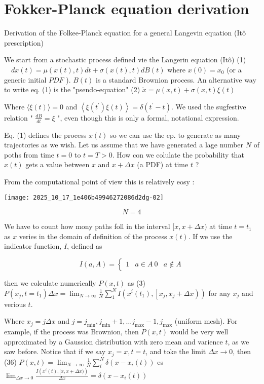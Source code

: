\section{Fokker-Planck equation derivation}
Derivation of the Folkee-Planck equation for a general Langevin equation (Itô prescription)

We start from a stochastic process defined vie the Langerin equation (Itô)
(1) $\quad d x(t)=\mu(x(t), t) d t+\sigma(x(t), t) d B(t)$
where $x(0)=x_{0}$ (or a generic initial $P D F$ ). $B(t)$ is a standard Brownion process.
An alternative way to write eq. (1) is the "psendo-equation"
(2) $\dot{x}=\mu(x, t)+\sigma(x, t) \xi(t)$

Where $\langle\xi(t)\rangle=0$ and $\left\langle\xi\left(t^{\prime}\right) \xi(t)\right\rangle=\delta\left(t^{\prime}-t\right)$. We used the sugfestive relation " $\frac{d B}{d t}=\xi$ ", even though this is only a formal, notational expression.

Eq. (1) defines the process $x(t)$ so we can use the ep. to generate as many trajectories as we wish. Let us assume that we have generated a lage number $N$ of poths from time $t=0$ to $t=T>0$. How con we colulate the probability that $x(t)$ gets a value between $x$ and $x+\Delta x$ (a PDF) at time $t$ ?

From the computational point of view this is relatively eosy :
\begin{center}
\texttt{[image: 2025\_10\_17\_1e406b49946272086d2dg-02]}
\end{center}

$$
N=4
$$

We have to count how mony paths foll in the interval $[x, x+\Delta x)$ at time $t=t_{1}$ as $x$ veries in the domain of definition of the process $x(t)$.
If we use the indicator function, $I$, defined as

$$ I(a, A)= \begin{cases}1 & a \in A \ 0 & a \notin A\end{cases} $$

then we colculate numerically $P(x, t)$ as
(3) $P\left(x_{j}, t=t_{1}\right) \Delta x=\lim _{N \rightarrow \infty} \frac{1}{N} \sum_{1}^{N} I\left(x^{i}\left(t_{1}\right),\left[x_{j}, x_{j}+\Delta x\right)\right)$ for any $x_{j}$ and verious $t$.

Where $x_{j}=j \Delta x$ and $j=j_{\min }, j_{\min }+1, \ldots j_{\max }-1, j_{\max }$ (uniform mesh). For example, if the process was Brownion, then $P(x, t)$ would be very well approximated by a Gaussion distribution with zero mean and varience $t$, as we saw before. Notice that if we say $x_{j}=x, t=t$, and toke the limit $\Delta x \rightarrow 0$, then
(36) $P(x, t)=\lim _{N \rightarrow \infty} \frac{1}{N} \sum_{i}^{N} \delta\left(x-x_{i}(t)\right)$ es $\lim _{\Delta x \rightarrow 0} \frac{I\left(x^{i}(t),[x, x+\Delta x)\right)}{\Delta x}=\delta\left(x-x_{i}(t)\right)$

